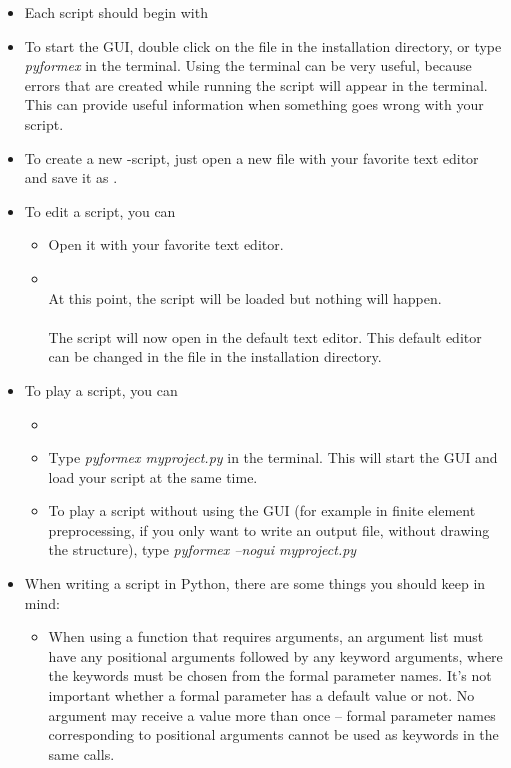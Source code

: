 {\begin{itemize}
\item Each script should begin with 
\item To start the \pyformex GUI, double click on the file  in the installation directory, or type \emph{pyformex} in the terminal. Using the terminal can be very useful, because errors that are created while running the script will appear in the terminal. This can provide useful information when something goes wrong with your script.
\item To create a new \pyformex-script, just open a new file with your favorite text editor and save it as .
\item To edit a script, you can
	\begin{itemize}
	\item Open it with your favorite text editor.
	\item {}\\
	At this point, the script will be loaded but nothing will happen. \\
	\\
	The script will now open in the default text editor. This default editor can be changed in the file  in 		the installation directory.
	\end{itemize}
\item To play a script, you can
	\begin{itemize}
	\item {}\\
	\item Type \emph{pyformex myproject.py} in the terminal. This will start the \pyformex GUI and load your script at the same time. \\
	\item To play a script without using the GUI (for example in finite element preprocessing, if you only want to write an 		output file, without drawing the structure), type \emph{pyformex --nogui myproject.py}
	\end{itemize}
\item When writing a script in Python, there are some things you should keep in mind:
	\begin{itemize}
	\item When using a function that requires arguments, an argument list must have any positional arguments followed by any keyword arguments, where the keywords must be chosen from the formal parameter names. It's not important whether a formal parameter has a default value or not. No argument may receive a value more than once -- formal parameter names corresponding to positional arguments cannot be used as keywords in the same calls. 


\end{itemize}
\end{itemize}}
